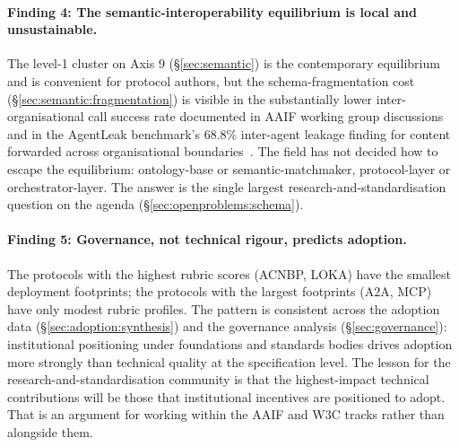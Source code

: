 \paragraph{Finding 4: The semantic-interoperability
equilibrium is local and unsustainable.}
The level-1 cluster on Axis 9
(\S\ref{sec:semantic}) is the contemporary
equilibrium and is convenient for protocol authors,
but the schema-fragmentation cost
(\S\ref{sec:semantic:fragmentation}) is visible in
the substantially lower inter-organisational call
success rate documented in AAIF working group
discussions~\cite{lf_aaif} and in the AgentLeak
benchmark's 68.8\% inter-agent leakage finding for
content forwarded across organisational
boundaries~\cite{agentleak}. The field has not
decided how to escape the equilibrium: ontology-base
or semantic-matchmaker, protocol-layer or
orchestrator-layer. The
answer is the single largest
research-and-standardisation question on the
agenda (\S\ref{sec:openproblems:schema}).

\paragraph{Finding 5: Governance, not technical
rigour, predicts adoption.}
\label{sec:conclusion:governance}
The protocols with the highest rubric scores
(ACNBP, LOKA) have the smallest deployment
footprints; the protocols with the largest
footprints (A2A, MCP) have only modest rubric
profiles. The pattern is consistent across the
adoption data (\S\ref{sec:adoption:synthesis}) and
the governance analysis (\S\ref{sec:governance}):
institutional positioning under foundations and
standards bodies drives adoption more strongly
than technical quality at the specification level.
The lesson for the research-and-standardisation
community is that the highest-impact technical
contributions will be those that institutional
incentives are positioned to adopt. That is an argument
for working within the AAIF and W3C tracks rather
than alongside them.

